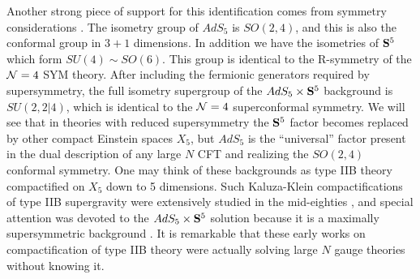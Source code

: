 Another strong piece of support for this identification comes from
symmetry considerations \cite{jthroat}. The isometry group of
$AdS_5$ is $SO(2,4)$, and this is also the conformal group in
$3+1$ dimensions. In addition we have the isometries of ${\bf S}^5$ which
form $SU(4)\sim SO(6)$. This group is identical to the R-symmetry of
the ${\cal N}=4$ SYM theory. After including the fermionic generators
required by supersymmetry, the full isometry supergroup of the
$AdS_5\times {\bf S}^5$ background is $SU(2,2|4)$, which is identical to
the ${\cal N}=4$ superconformal symmetry.
We will see that in theories with reduced supersymmetry
the ${\bf S}^5$ factor becomes replaced by other
compact Einstein spaces $X_5$,
but $AdS_5$ is the ``universal'' factor present in the dual
description of any large $N$ CFT and realizing the $SO(2,4)$ conformal
symmetry. One may think of these backgrounds as type IIB theory
compactified on $X_5$ down to 5 dimensions. Such Kaluza-Klein
compactifications of type IIB supergravity were extensively studied in the
mid-eighties \cite{GRW,Romans,Duff}, and special attention was devoted to
the $AdS_5\times {\bf S}^5$ solution because it is
a maximally supersymmetric background \cite{SH,Kim}.
It is remarkable that these early works on compactification
of type IIB theory
were actually solving large $N$ gauge theories without knowing it.

